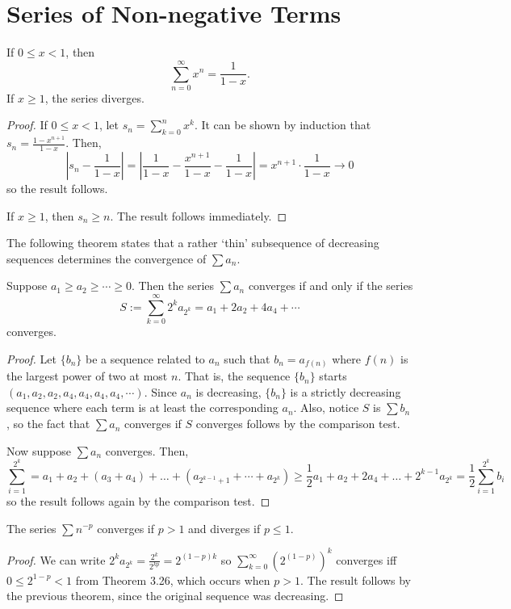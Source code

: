 \section{Series of Non-negative Terms}

\begin{theorem} %
If $0 \le x < 1$, then
\[
	\sum_{n=0}^{\infty} x^n = \frac{1}{1 - x}.
\]
If $x \ge 1$, the series diverges.

\begin{proof}
If $0 \le x < 1$, let $s_n = \sum_{k=0}^{n} x^k$. It can be shown by induction that $s_n = \frac{1 - x^{n+1}}{1 - x}$. Then,
\[
	\left|s_n - \frac{1}{1 - x}\right| = \left| \frac{1}{1 - x} - \frac{x^{n+1}}{1 - x} - \frac{1}{1 - x}\right| = x^{n + 1} \cdot \frac{1}{1 - x} \to 0
\]
so the result follows.

If $x \ge 1$, then $s_n \ge n$. The result follows immediately.
\end{proof}
\end{theorem}

The following theorem states that a rather `thin' subsequence of decreasing sequences determines the convergence of $\sum a_n$.
\begin{theorem}[Cauchy] %
Suppose $a_1 \ge a_2 \ge \dotsb \ge 0$. Then the series $\sum a_n$ converges if and only if the series
\[
	S := \sum_{k=0}^{\infty} 2^k a_{2^k} = a_1 + 2a_2 + 4a_4 + \dotsb
\]
converges.

\begin{proof}
Let $\{b_n\}$ be a sequence related to $a_n$ such that $b_n = a_{f(n)}$ where $f(n)$ is the largest power of two at most $n$. That is, the sequence $\{b_n\}$ starts $(a_1, a_2, a_2, a_4, a_4, a_4, a_4, \dotsb)$. Since $a_n$ is decreasing, $\{b_n\}$ is a strictly decreasing sequence where each term is at least the corresponding $a_n$. Also, notice $S$ is $\sum b_n$, so the fact that $\sum a_n$ converges if $S$ converges follows by the comparison test.

Now suppose $\sum a_n$ converges. Then, 
\[
	\sum_{i=1}^{2^k} = a_1 + a_2 + (a_3 + a_4) + \dotsc + (a_{2^{k-1}+1} + \dotsb + a_{2^k}) \ge \frac{1}{2} a_1 + a_2 + 2a_4 + \dotsc + 2^{k-1} a_{2^k} = \frac{1}{2} \sum_{i=1}^{2^k} b_i
\]
so the result follows again by the comparison test.
\end{proof}
\end{theorem}

\begin{theorem} %
The series $\sum n^{-p}$ converges if $p > 1$ and diverges if $p \le 1$. 

\begin{proof}
We can write $2^k a_{2^k} = \frac{2^k}{2^{kp}} = 2^{(1-p)k}$ so $\sum_{k=0}^{\infty} (2^{(1-p)})^k$ converges iff $0 \le 2^{1-p} < 1$ from Theorem 3.26, which occurs when $p > 1$. The result follows by the previous theorem, since the original sequence was decreasing.
\end{proof}
\end{theorem}

